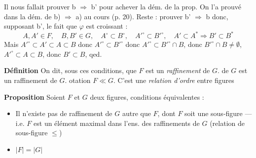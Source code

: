 \documentclass[11pt,a4paper]{article}
\begin{document}
Il nous fallait prouver b $\Rightarrow$ b' pour achever la dém. de la prop.   On l'a prouvé \struck{\ill{}} dans la dém. de b) $\Rightarrow$ a) au cours (p. 20). Reste : prouver b' $\Rightarrow$ b donc, supposant b', le fait que $\varphi$ est croissant :
\[
  A, A' \in F, \quad B, B' \in G, \quad A^{\circ} \subset B^{\circ}, \quad A'^{\circ} \subset B'^{\circ}, \quad A' \subset A^{*} \Longrightarrow B' \subset B^{*}
\]
Mais  $A'^{\circ} \subset A' \subset A \subset B$ donc $A'^{\circ} \subset B'^{\circ}$   donc $A'^{\circ} \subset B'^{\circ} \cap B$, donc $B'^{\circ} \cap B \neq \emptyset$, $A'^{\circ} \subset A \subset B$, donc $B' \subset B$, qed.

\textbf{Définition} On dit, sous ces conditions, que $F$ est un \emph{raffinement} de $G$.  de $G$ est un raffinement de $G$. otation $F \ll G$. C'est  une \emph{relation d'ordre} entre figures\uncertain{,}

\textbf{Proposition} Soient $F$ et $G$ deux figures,    conditions équivalentes :
\begin{itemize}
  \item[a)]  Il n'existe pas de raffinement de $G$ autre que $F$,  \ill{} dont $F$ soit une sous-figure — i.e. $F$ est un élément maximal dans l'ens. des raffinements de $G$ (relation de sous-figure $\leq$)
  \item[b)]  $|F| = |G|$
\end{itemize}

\end{document}
